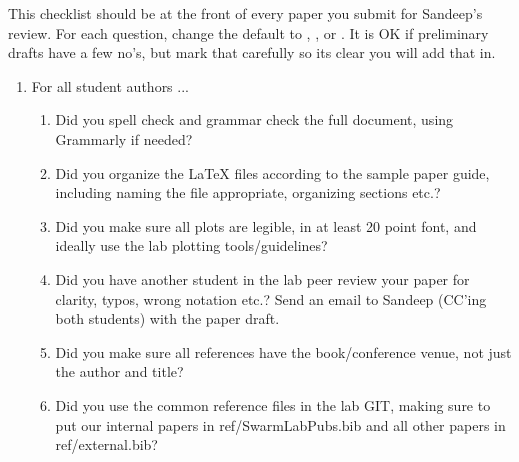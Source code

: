 This checklist should be at the front of every paper you submit for Sandeep's review. 
For each question, change the default \answerTODO{} to \answerYes{},
\answerNo{}, or \answerNA{}. It is OK if preliminary drafts have a few no's, but mark that carefully so its clear you will add that in.


\begin{enumerate}

\item For all student authors ...
\begin{enumerate}
    \item Did you spell check and grammar check the full document, using Grammarly if needed?
    \answerTODO{}
    \item Did you organize the LaTeX files according to the sample paper guide, including naming the file appropriate, organizing sections etc.? \answerTODO{}
  \item Did you make sure all plots are legible, in at least 20 point font, and ideally use the lab plotting tools/guidelines? \answerTODO{}
  \item Did you have another student in the lab peer review your paper for clarity, typos, wrong notation etc.? Send an email to Sandeep (CC'ing both students) with the paper draft. \answerTODO{}
  \item Did you make sure all references have the book/conference venue, not just the author and title? \answerTODO{}
  \item Did you use the common reference files in the lab GIT, making sure to put our internal papers in ref/SwarmLabPubs.bib and all other papers in ref/external.bib?
\end{enumerate}

\end{enumerate}
